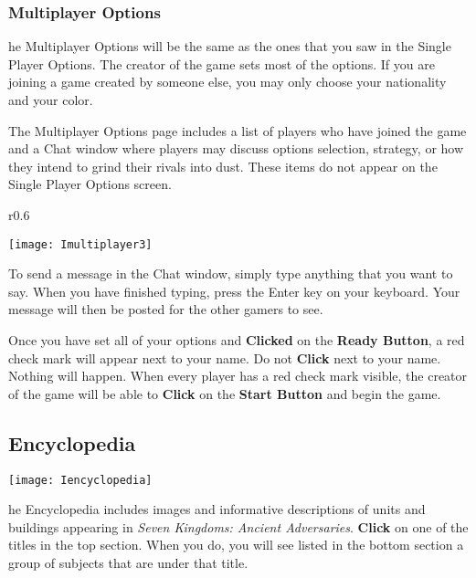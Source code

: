 \subsubsection{\textsf{Multiplayer Options}}

he Multiplayer Options will be the same as the ones that you saw in the Single Player Options. The creator of the game sets most of the options. If you are joining a game created by someone else, you may only choose your nationality and your color.

The Multiplayer Options page includes a list of players who have joined the game and a Chat window where players may discuss options selection, strategy, or how they intend to grind their rivals into dust. These items do not appear on the Single Player Options screen.

\begin{wrapfigure}{r}{0.6\textwidth}
	\begin{center}
		\vspace{-20pt}
		\texttt{[image: Imultiplayer3]} %
	\end{center}
	\vspace{-20pt}
\end{wrapfigure}

To send a message in the Chat window, simply type anything that you want to say. When you have finished typing, press the Enter key on your keyboard. Your message will then be posted for the other gamers to see.

Once you have set all of your options and \textbf{Clicked} on the \textbf{Ready Button}, a red check mark will appear next to your name. Do not \textbf{Click} next to your name. Nothing will happen. When every player has a red check mark visible, the creator of the game will be able to \textbf{Click} on the \textbf{Start Button} and begin the game.

\subsection{\textsf{Encyclopedia}}


\begin{center}
    \texttt{[image: Iencyclopedia]} %
\end{center}


he Encyclopedia includes images and informative descriptions of units and buildings appearing in \textit{Seven Kingdoms: Ancient Adversaries}. \textbf{Click} on one of the titles in the top section. When you do, you will see listed in the bottom section a group of subjects that are under that title.

